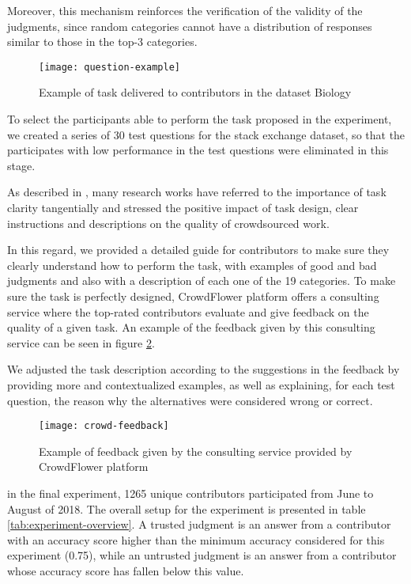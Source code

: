Moreover, this mechanism reinforces the verification of the validity of the judgments, since random categories cannot have a distribution of responses similar to those in the top-3 categories.




\begin{figure}[!h]
\centering
  \texttt{[image: question-example]}
  \caption{Example of task delivered to contributors in the dataset Biology}
  \label{fig:example-question}
\end{figure}

 
To select the participants able to perform the task proposed in the experiment, we created a series of 30 test questions for the stack exchange dataset, so that the participates with low performance in the test questions were eliminated in this stage.


As described in \cite{Gadiraju:2017}, many research works have referred to the importance of task clarity tangentially and stressed the positive impact of task design, clear instructions and descriptions on the quality of crowdsourced work. 

In this regard, we provided a detailed guide for contributors to make sure they clearly understand how to perform the task, with examples of good and bad judgments and also with a description of each one of the 19 categories. To make sure the task is perfectly designed, CrowdFlower platform offers a consulting service where the top-rated contributors evaluate and give feedback on the quality of a given task. An example of the feedback given by this consulting service can be seen in figure \ref{fig:example-feedback}. 

We adjusted the task description according to the suggestions in the feedback by providing more and contextualized examples, as well as explaining, for each test question, the reason why the alternatives were considered wrong or correct.  

\begin{figure}[!h]
\centering
  \texttt{[image: crowd-feedback]}
  \caption{Example of feedback given by the consulting service provided by CrowdFlower platform}
  \label{fig:example-feedback}
\end{figure}


in the final experiment, 1265 unique contributors participated from June to August of 2018. The overall setup for the experiment is presented in table \ref{tab:experiment-overview}. A trusted judgment is an answer from a contributor with an accuracy score higher than the minimum accuracy considered for this experiment (0.75), while an untrusted judgment is an answer from a contributor whose accuracy score has fallen below this value.

